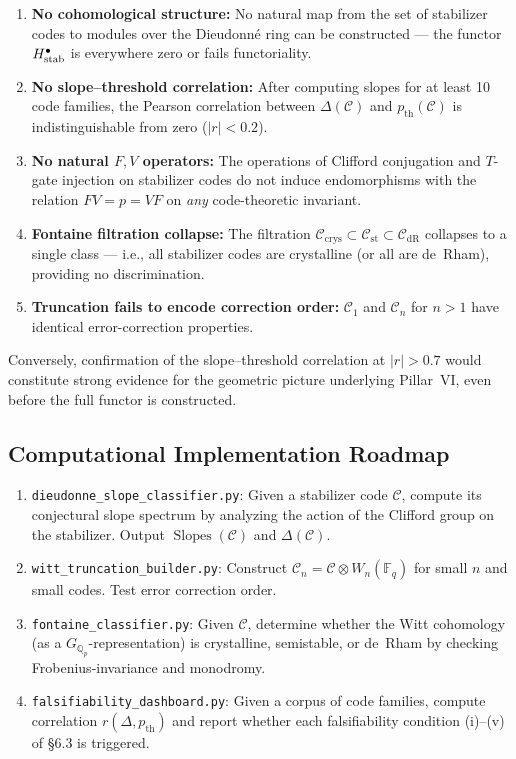 \documentclass[12pt]{article}
\theoremstyle{definition}
\theoremstyle{plain}
\theoremstyle{remark}
\newcommand{\Fq}{\mathbb{F}_q}
\newcommand{\Qp}{\mathbb{Q}_p}
\newcommand{\cC}{\mathcal{C}}
\begin{document}
\begin{enumerate}[label=(\roman*),leftmargin=*]
  \item \textbf{No cohomological structure:} No natural map from the set of stabilizer codes to modules over the Dieudonn\'{e} ring can be constructed — the functor $H^{\bullet}_{\textup{stab}}$ is everywhere zero or fails functoriality.
  \item \textbf{No slope--threshold correlation:} After computing slopes for at least 10 code families, the Pearson correlation between $\Delta(\cC)$ and $p_{\mathrm{th}}(\cC)$ is indistinguishable from zero ($|r|<0.2$).
  \item \textbf{No natural $F,V$ operators:} The operations of Clifford conjugation and $T$-gate injection on stabilizer codes do not induce endomorphisms with the relation $FV=p=VF$ on \emph{any} code-theoretic invariant.
  \item \textbf{Fontaine filtration collapse:} The filtration $\cC_{\mathrm{crys}}\subset\cC_{\mathrm{st}}\subset\cC_{\mathrm{dR}}$ collapses to a single class — i.e., all stabilizer codes are crystalline (or all are de~Rham), providing no discrimination.
  \item \textbf{Truncation fails to encode correction order:} $\cC_1$ and $\cC_n$ for $n>1$ have identical error-correction properties.
\end{enumerate}

Conversely, confirmation of the slope--threshold correlation at $|r|>0.7$ would constitute strong evidence for the geometric picture underlying Pillar~VI, even before the full functor is constructed.

\subsection{Computational Implementation Roadmap}

\begin{enumerate}[label=(\alph*),leftmargin=*]
  \item \texttt{dieudonne\_slope\_classifier.py}: Given a stabilizer code $\cC$, compute its conjectural slope spectrum by analyzing the action of the Clifford group on the stabilizer. Output $\operatorname{Slopes}(\cC)$ and $\Delta(\cC)$.
  \item \texttt{witt\_truncation\_builder.py}: Construct $\cC_n=\cC\otimes W_n(\Fq)$ for small $n$ and small codes. Test error correction order.
  \item \texttt{fontaine\_classifier.py}: Given $\cC$, determine whether the Witt cohomology (as a $G_{\Qp}$-representation) is crystalline, semistable, or de~Rham by checking Frobenius-invariance and monodromy.
  \item \texttt{falsifiability\_dashboard.py}: Given a corpus of code families, compute correlation $r(\Delta,p_{\mathrm{th}})$ and report whether each falsifiability condition (i)--(v) of \S6.3 is triggered.
\end{enumerate}
\end{document}
